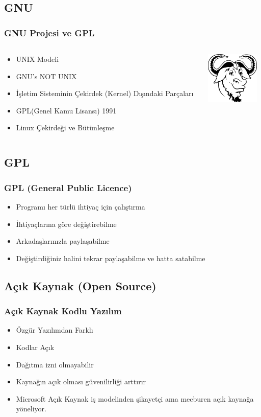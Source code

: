 \documentclass{beamer}
\begin{document}
	\subsection{GNU}
		\begin{frame}
		 	\frametitle{GNU Projesi ve GPL}
			\begin{columns}
			\begin{column}[l]{5cm}
				\begin{itemize}[<+->]
					\item UNIX Modeli
					\item GNU's NOT UNIX
					\item İşletim Sisteminin Çekirdek (Kernel) Dışındaki Parçaları
					\item GPL(Genel Kamu Lisansı) 1991
					\item Linux Çekirdeği ve Bütünleşme
				\end{itemize}
			\end{column}
			\begin{column}[r]{5cm}		
				\includegraphics{img/gnukucuk.jpg}
			\end{column}
			\end{columns}


		\end{frame}
	\subsection{GPL}
		\begin{frame}
		 	\frametitle{GPL (General Public Licence)}
			\begin{itemize}
			 \item Programı her türlü ihtiyaç için çalıştırma
			 \item İhtiyaçlarına göre değiştirebilme
			 \item Arkadaşlarınızla paylaşabilme
			 \item Değiştirdiğiniz halini tekrar paylaşabilme ve hatta satabilme
			\end{itemize}

		\end{frame}


	\subsection{Açık Kaynak (Open Source)}
		\begin{frame}
		 	\frametitle{Açık Kaynak Kodlu Yazılım}
			\begin{itemize}
			 \item Özgür Yazılımdan Farklı
			 \item Kodlar Açık
			 \item Dağıtma izni olmayabilir
			 \item Kaynağın açık olması güvenilirliği arttırır
			 \item Microsoft Açık Kaynak iş modelinden şikayetçi ama mecburen açık kaynağa yöneliyor.
			\end{itemize}
		\end{frame}
\end{document}
